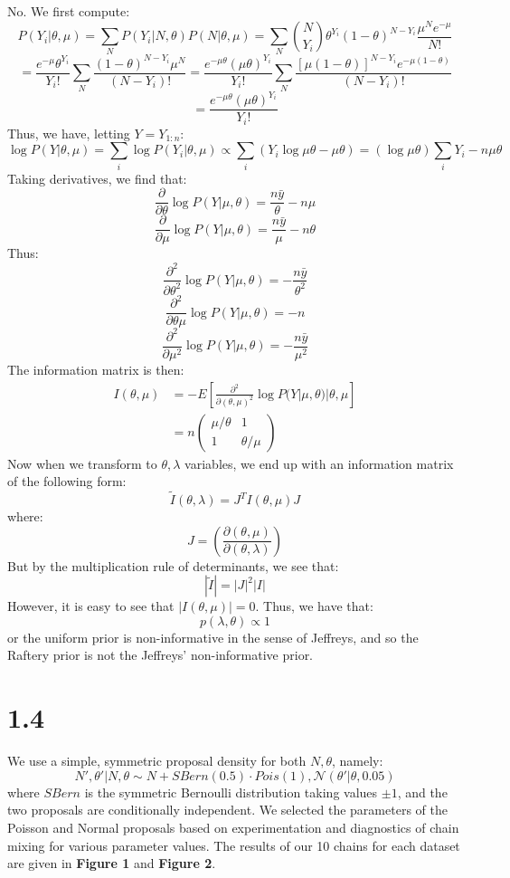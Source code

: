 \documentclass[10pt,psamsfonts]{amsart}
\theoremstyle{definition}
\theoremstyle{remark}
\numberwithin{equation}{section}
\begin{document}
No. We first compute:
$$P(Y_i|\theta, \mu) = \sum_N P(Y_i|N, \theta) P(N|\theta, \mu) = \sum_N{N \choose Y_i} \theta^{Y_i}(1-\theta)^{N-Y_i} \frac{\mu^N e^{-\mu}}{N!}$$
$$ = \frac{e^{-\mu}\theta^{Y_i}}{Y_i!}\sum_N \frac{(1-\theta)^{N-Y_i}\mu^N}{(N-Y_i)!} = \frac{e^{-\mu\theta}(\mu\theta)^{Y_i}}{Y_i!}\sum_N \frac{[\mu(1-\theta)]^{N-Y_i}e^{-\mu(1-\theta)}}{(N-Y_i)!}$$
$$=\frac{e^{-\mu\theta}(\mu\theta)^{Y_i}}{Y_i!}$$
Thus, we have, letting $Y = Y_{1:n}$:
$$\log P(Y|\theta, \mu) = \sum_i \log P(Y_i|\theta, \mu) \propto \sum_i (Y_i\log \mu\theta - \mu\theta) = (\log\mu\theta) \sum_i Y_i - n\mu\theta$$
Taking derivatives, we find that:
$$\frac{\partial}{\partial \theta} \log P(Y|\mu, \theta) = \frac{n\bar{y}}{\theta} - n\mu$$
$$\frac{\partial}{\partial \mu} \log P(Y|\mu, \theta) = \frac{n\bar{y}}{\mu} - n\theta$$
Thus:
$$\frac{\partial^2}{\partial\theta^2}\log P(Y|\mu, \theta)  = -\frac{n\bar{y}}{\theta^2}$$
$$\frac{\partial^2}{\partial\theta\mu} \log P(Y|\mu, \theta)  = -n$$
$$\frac{\partial^2}{\partial \mu^2} \log P(Y|\mu, \theta)  = -\frac{n\bar{y}}{\mu^2}$$
The information matrix is then:
\begin{align*}
I(\theta,\mu) &= -E\left[ \frac{\partial^2}{\partial(\theta,\mu)^2} \log P(Y|\mu, \theta) |\theta,\mu \right]\\
&=n \begin{pmatrix} \mu/\theta & 1 \\ 1 & \theta/\mu \end{pmatrix}
\end{align*}
Now when we transform to $\theta, \lambda$ variables, we end up with an information matrix of the following form:
$$\tilde{I}(\theta, \lambda) = J^T I(\theta, \mu) J$$
where:
$$J = \left(\frac{\partial(\theta, \mu)}{\partial(\theta, \lambda)}\right)$$
But by the multiplication rule of determinants, we see that:
$$|\tilde{I}| = |J|^2 |I|$$
However, it is easy to see that $|I(\theta, \mu)| = 0$. Thus, we have that:
$$p(\lambda, \theta) \propto 1$$
or the uniform prior is non-informative in the sense of Jeffreys, and so the Raftery prior is not the Jeffreys' non-informative prior.

\section*{1.4}

We use a simple, symmetric proposal density for both $N, \theta$, namely:
$$N', \theta' | N, \theta \sim N + SBern(0.5) \cdot Pois(1), \mathcal{N}(\theta'|\theta, 0.05)$$
where $SBern$ is the symmetric Bernoulli distribution taking values $\pm 1$, and the two proposals are conditionally independent. We selected the parameters of the Poisson and Normal proposals based on experimentation and diagnostics of chain mixing for various parameter values. The results of our 10 chains for each dataset are given in {\bf Figure 1} and {\bf Figure 2}.
\end{document}
